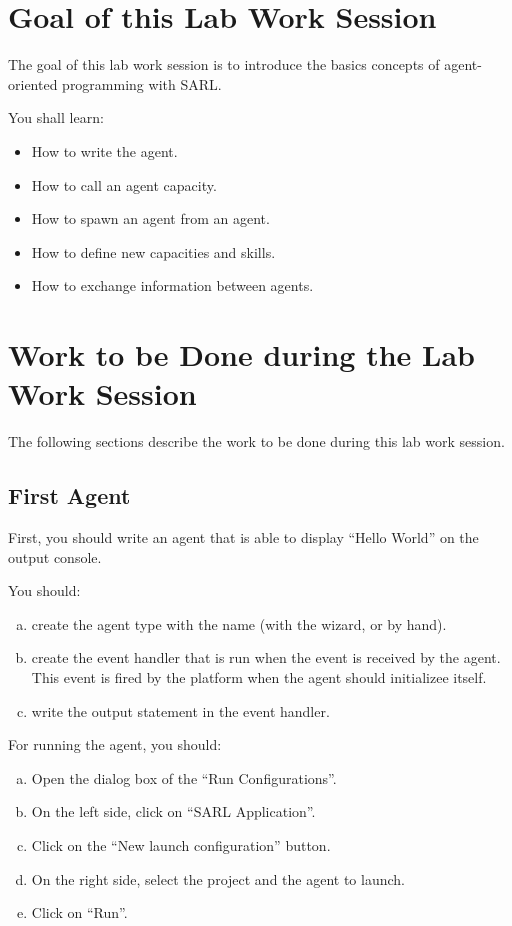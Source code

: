 \documentclass[article,english,nodocumentinfo]{multiagentfrreport}
\begin{document}
\section{Goal of this Lab Work Session}

The goal of this lab work session is to introduce the basics concepts of agent-oriented programming with SARL.

You shall learn: 
\begin{itemize}
\item How to write the agent.
\item How to call an agent capacity.
\item How to spawn an agent from an agent.
\item How to define new capacities and skills.
\item How to exchange information between agents.
\end{itemize}



\section{Work to be Done during the Lab Work Session}

The following sections describe the work to be done during this lab work session.

\subsection{First Agent}

First, you should write an agent that is able to display ``Hello World'' on the output console.

You should:
\begin{enumerate}[a)]
\item create the agent type with the name  (with the wizard, or by hand).
\item create the event handler that is run when the  event is received by the agent. This event is fired by the platform when the agent should initializee itself.
\item write the output statement in the event handler.
\end{enumerate}

For running the agent, you should:
\begin{enumerate}[a)]
\item Open the dialog box of the ``Run Configurations''.
\item On the left side, click on ``SARL Application''.
\item Click on the ``New launch configuration'' button.
\item On the right side, select the project and the agent to launch.
\item Click on ``Run''.
\end{enumerate}
\end{document}

